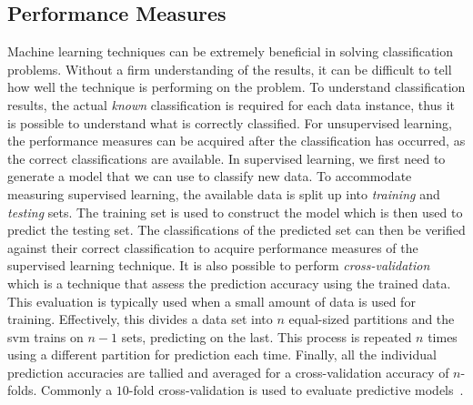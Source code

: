 \subsection{Performance Measures}
\label{subsec:background_performance_measures}
Machine learning techniques can be extremely beneficial in solving classification problems. Without a firm understanding of the results, it can be difficult to tell how well the technique is performing on the problem. To understand classification results, the actual \emph{known} classification is required for each data instance, thus it is possible to understand what is correctly classified. For unsupervised learning, the performance measures can be acquired after the classification has occurred, as the correct classifications are available. In supervised learning, we first need to generate a model that we can use to classify new data. To accommodate measuring supervised learning, the available data is split up into \emph{training} and \emph{testing} sets. The training set is used to construct the model which is then used to predict the testing set. The classifications of the predicted set can then be verified against their correct classification to acquire performance measures of the supervised learning technique. It is also possible to perform \emph{cross-validation} which is a technique that assess the prediction accuracy using the trained data. This evaluation is typically used when a small amount of data is used for training. Effectively, this divides a data set into $n$ equal-sized partitions and the \gls{svm} trains on $n-1$ sets, predicting on the last. This process is repeated $n$ times using a different partition for prediction each time. Finally, all the individual prediction accuracies are tallied and averaged for a cross-validation accuracy of $n$-folds. Commonly a $10$-fold cross-validation is used to evaluate predictive models~\cite{Koh95}.

